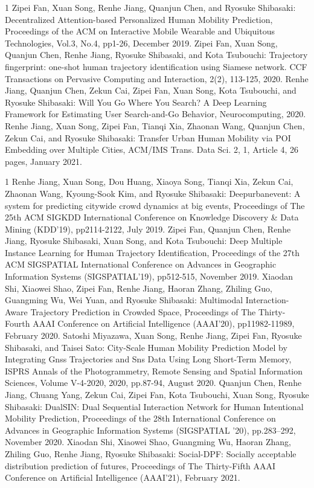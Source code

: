 \begin{雑誌論文}{1}
Zipei Fan, Xuan Song, Renhe Jiang, Quanjun Chen, and Ryosuke Shibasaki:
Decentralized Attention-based Personalized Human Mobility Prediction, Proceedings of the ACM on Interactive Mobile Wearable and Ubiquitous Technologies, Vol.3, No.4, pp1-26, December 2019.
Zipei Fan, Xuan Song, Quanjun Chen, Renhe Jiang, Ryosuke Shibasaki, and Kota Tsubouchi:  
Trajectory fingerprint: one-shot human trajectory identification using Siamese network. CCF Transactions on Pervasive Computing and Interaction, 2(2), 113-125, 2020.
Renhe Jiang, Quanjun Chen, Zekun Cai, Zipei Fan, Xuan Song, Kota Tsubouchi, and Ryosuke Shibasaki: 
Will You Go Where You Search? A Deep Learning Framework for Estimating User Search-and-Go Behavior, Neurocomputing, 2020.
Renhe Jiang, Xuan Song, Zipei Fan, Tianqi Xia, Zhaonan Wang, Quanjun Chen, Zekun Cai, and Ryosuke Shibasaki: 
Transfer Urban Human Mobility via POI Embedding over Multiple Cities, ACM/IMS Trans. Data Sci. 2, 1, Article 4, 26 pages, January 2021.
\end{雑誌論文}

\begin{査読付}{1}
Renhe Jiang, Xuan Song, Dou Huang, Xiaoya Song, Tianqi Xia, Zekun Cai, Zhaonan Wang, Kyoung-Sook Kim, and Ryosuke Shibasaki:
Deepurbanevent: A system for predicting citywide crowd dynamics at big events, Proceedings of The 25th ACM SIGKDD International Conference on Knowledge Discovery \& Data Mining (KDD'19), pp2114-2122, July 2019.
Zipei Fan, Quanjun Chen, Renhe Jiang, Ryosuke Shibasaki, Xuan Song, and Kota Tsubouchi:
Deep Multiple Instance Learning for Human Trajectory Identification, Proceedings of the 27th ACM SIGSPATIAL International Conference on Advances in Geographic Information Systems (SIGSPATIAL'19), pp512-515, November 2019.
Xiaodan Shi, Xiaowei Shao, Zipei Fan, Renhe Jiang, Haoran Zhang, Zhiling Guo, Guangming Wu, Wei Yuan, and Ryosuke Shibasaki:
Multimodal Interaction-Aware Trajectory Prediction in Crowded Space, Proceedings of The Thirty-Fourth AAAI Conference on Artificial Intelligence (AAAI'20), pp11982-11989, February 2020.
Satoshi Miyazawa, Xuan Song, Renhe Jiang, Zipei Fan, Ryosuke Shibasaki, and Taisei Sato:
City-Scale Human Mobility Prediction Model by Integrating Gnss Trajectories and Sns Data Using Long Short-Term Memory, ISPRS Annals of the Photogrammetry, Remote Sensing and Spatial Information Sciences, Volume V-4-2020, 2020, pp.87-94, August 2020.
Quanjun Chen, Renhe Jiang, Chuang Yang, Zekun Cai, Zipei Fan, Kota Tsubouchi, Xuan Song, Ryosuke Shibasaki: 
DualSIN: Dual Sequential Interaction Network for Human Intentional Mobility Prediction, Proceedings of the 28th International Conference on Advances in Geographic Information Systems (SIGSPATIAL '20), pp.283–292, November 2020.
Xiaodan Shi, Xiaowei Shao, Guangming Wu, Haoran Zhang, Zhiling Guo, Renhe Jiang, Ryosuke Shibasaki: 
Social-DPF: Socially acceptable distribution prediction of futures, Proceedings of The Thirty-Fifth AAAI Conference on Artificial Intelligence (AAAI'21), February 2021.
\end{査読付}



